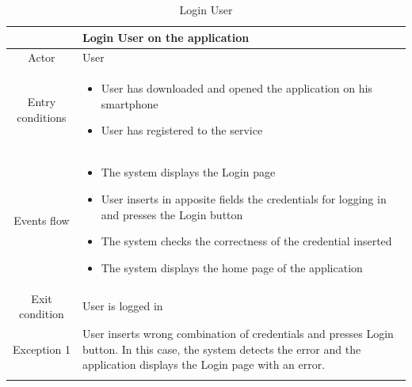 \documentclass[table, 12pt]{article}
\begin{document}
\begin{longtable}{|c| p{10cm}|}
    \hline
                     & Login User on the application                                                                                                                                                 \\
    \hline
    Actor            & User                                                                                                                                                                          \\
    \hline
    Entry conditions & \begin{itemize}[nosep,after=\strut]
        \item User has downloaded and opened the application on his smartphone
        \item User has registered to the service
    \end{itemize}                                                                                                                                                    \\
    \hline
    Events flow      & \begin{itemize}[nosep,after=\strut]
        \item The system displays the Login page
        \item User inserts in apposite fields the credentials for logging in and presses the Login button
        \item The system checks the correctness of the credential inserted
        \item The system displays the home page of the application
    \end{itemize}                                                                                                                                                    \\
    \hline
    Exit condition   & User is logged in                                                                                                                                                             \\
    \hline
    \hline
    Exception 1      & User inserts wrong combination of credentials and presses Login button. In this case, the system detects the error and the application displays the Login page with an error. \\
    \hline
    \caption{Login User}                                                                                                                                                                             \\
\end{longtable}
\end{document}
